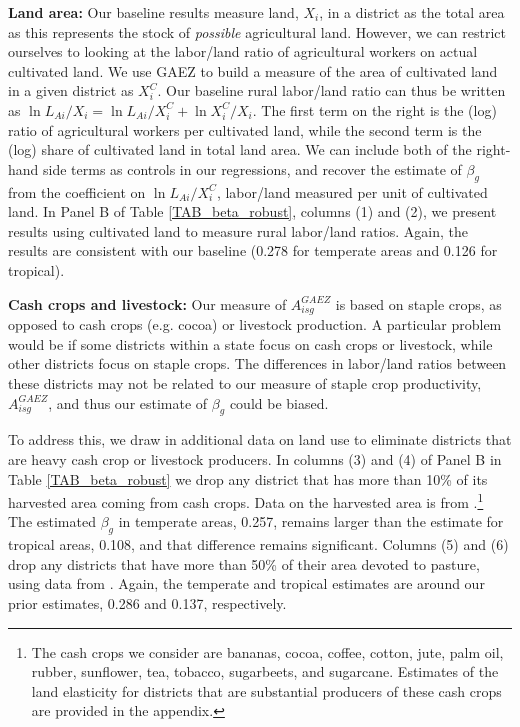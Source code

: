 \documentclass[11pt]{article}
\begin{document}
\vspace{.5cm}\noindent\textbf{Land area:} Our baseline results measure land, $X_i$, in a district as the total area as this represents the stock of \textit{possible} agricultural land. However, we can restrict ourselves to looking at the labor/land ratio of agricultural workers on actual cultivated land. We use GAEZ to build a measure of the area of cultivated land in a given district as $X^C_i$. Our baseline rural labor/land ratio can thus be written as $\ln L_{Ai}/X_i = \ln L_{Ai}/X_i^C + \ln X_i^C/X_i$. The first term on the right is the (log) ratio of agricultural workers per cultivated land, while the second term is the (log) share of cultivated land in total land area. We can include both of the right-hand side terms as controls in our regressions, and recover the estimate of $\beta_g$ from the coefficient on $\ln L_{Ai}/X_i^C$, labor/land measured per unit of cultivated land. In Panel B of Table \ref{TAB_beta_robust}, columns (1) and (2), we present results using cultivated land to measure rural labor/land ratios. Again, the results are consistent with our baseline (0.278 for temperate areas and 0.126 for tropical). 

\vspace{.5cm}\noindent\textbf{Cash crops and livestock:} Our measure of $A_{isg}^{GAEZ}$ is based on staple crops, as opposed to cash crops (e.g. cocoa) or livestock production. A particular problem would be if some districts within a state focus on cash crops or livestock, while other districts focus on staple crops. The differences in labor/land ratios between these districts may not be related to our measure of staple crop productivity, $A_{isg}^{GAEZ}$, and thus our estimate of $\beta_g$ could be biased. 

To address this, we draw in additional data on land use to eliminate districts that are heavy cash crop or livestock producers. In columns (3) and (4) of Panel B in Table \ref{TAB_beta_robust} we drop any district that has more than 10\% of its harvested area coming from cash crops. Data on the harvested area is from \cite{mrf2008}.\footnote{The cash crops we consider are bananas, cocoa, coffee, cotton, jute, palm oil, rubber, sunflower, tea, tobacco, sugarbeets, and sugarcane. Estimates of the land elasticity for districts that are substantial producers of these cash crops are provided in the appendix.} The estimated $\beta_g$ in temperate areas, 0.257, remains larger than the estimate for tropical areas, 0.108, and that difference remains significant. Columns (5) and (6) drop any districts that have more than 50\% of their area devoted to pasture, using data from \cite{remf2008}. Again, the temperate and tropical estimates are around our prior estimates, 0.286 and 0.137, respectively.
\end{document}
